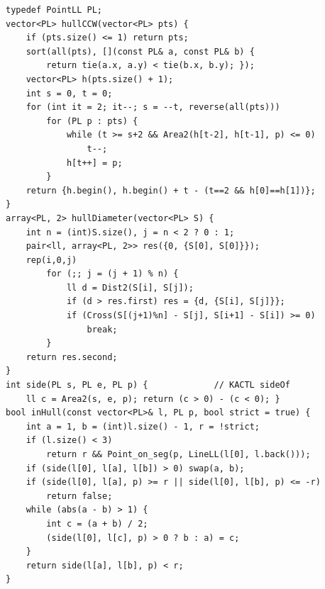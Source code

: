 
\begin{lstlisting}
typedef PointLL PL;
vector<PL> hullCCW(vector<PL> pts) {
    if (pts.size() <= 1) return pts;
    sort(all(pts), [](const PL& a, const PL& b) {
        return tie(a.x, a.y) < tie(b.x, b.y); });
    vector<PL> h(pts.size() + 1);
    int s = 0, t = 0;
    for (int it = 2; it--; s = --t, reverse(all(pts)))
        for (PL p : pts) {
            while (t >= s+2 && Area2(h[t-2], h[t-1], p) <= 0)
                t--;
            h[t++] = p;
        }
    return {h.begin(), h.begin() + t - (t==2 && h[0]==h[1])};
}
array<PL, 2> hullDiameter(vector<PL> S) {
    int n = (int)S.size(), j = n < 2 ? 0 : 1;
    pair<ll, array<PL, 2>> res({0, {S[0], S[0]}});
    rep(i,0,j)
        for (;; j = (j + 1) % n) {
            ll d = Dist2(S[i], S[j]);
            if (d > res.first) res = {d, {S[i], S[j]}};
            if (Cross(S[(j+1)%n] - S[j], S[i+1] - S[i]) >= 0)
                break;
        }
    return res.second;
}
int side(PL s, PL e, PL p) {             // KACTL sideOf
    ll c = Area2(s, e, p); return (c > 0) - (c < 0); }
bool inHull(const vector<PL>& l, PL p, bool strict = true) {
    int a = 1, b = (int)l.size() - 1, r = !strict;
    if (l.size() < 3)
        return r && Point_on_seg(p, LineLL(l[0], l.back()));
    if (side(l[0], l[a], l[b]) > 0) swap(a, b);
    if (side(l[0], l[a], p) >= r || side(l[0], l[b], p) <= -r)
        return false;
    while (abs(a - b) > 1) {
        int c = (a + b) / 2;
        (side(l[0], l[c], p) > 0 ? b : a) = c;
    }
    return side(l[a], l[b], p) < r;
}
\end{lstlisting}

